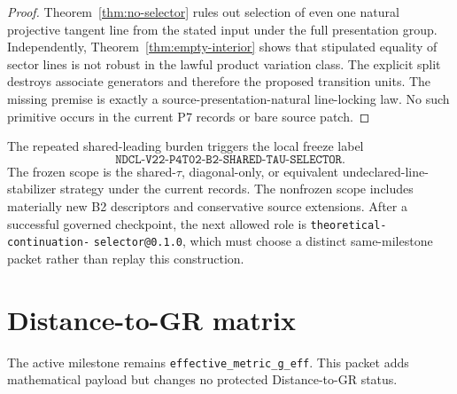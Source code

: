 \documentclass[11pt]{article}
\begin{document}
\begin{proof}
Theorem~\ref{thm:no-selector} rules out selection of even one natural
projective tangent line from the stated input under the full presentation
group.  Independently, Theorem~\ref{thm:empty-interior} shows that stipulated
equality of sector lines is not robust in the lawful product variation class.
The explicit split destroys associate generators and therefore the proposed
transition units.  The missing premise is exactly a
source-presentation-natural line-locking law.  No such primitive occurs in the
current P7 records or bare source patch.
\end{proof}

The repeated shared-leading burden triggers the local freeze label
\[
 \texttt{NDCL-V22-P4T02-B2-SHARED-TAU-SELECTOR}.
\]
The frozen scope is the shared-\(\tau\), diagonal-only, or equivalent
undeclared-line-stabilizer strategy under the current records.  The nonfrozen
scope includes materially new B2 descriptors and conservative source
extensions.  After a successful governed checkpoint, the next allowed role is
\texttt{theoretical-}\allowbreak\texttt{continuation-}\allowbreak
\texttt{selector@0.1.0}, which must choose a distinct
same-milestone packet rather than replay this construction.

\section{Distance-to-GR matrix}

The active milestone remains \texttt{effective\_metric\_g\_eff}.  This packet
adds mathematical payload but changes no protected Distance-to-GR status.
\end{document}
